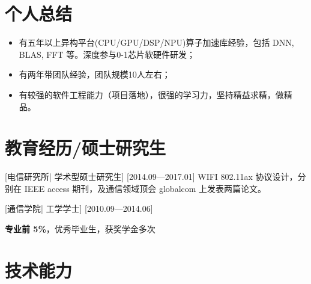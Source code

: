 \documentclass{resume}
\begin{document}


\ResumeTitle


\section{个人总结}

\begin{itemize}
  \item 有五年以上异构平台(CPU/GPU/DSP/NPU)算子加速库经验，包括 DNN, BLAS, FFT 等。深度参与0-1芯片软硬件研发；
  \item 有两年带团队经验，团队规模10人左右；
  \item 有较强的软件工程能力（项目落地），很强的学习力，坚持精益求精，做精品。
\end{itemize}

\section{教育经历/硕士研究生}
[\textnormal{电信研究所|}  学术型硕士研究生]
[2014.09—2017.01]
WIFI 802.11ax 协议设计，分别在 IEEE access 期刊，及通信领域顶会 globalcom 上发表两篇论文。

\nocite{*} %
\printbibliography[heading={none}]



[\textnormal{通信学院|} 工学学士]
[2010.09—2014.06]

\textbf{专业前 5\%}，优秀毕业生，获奖学金多次

\section{技术能力}
\end{document}
